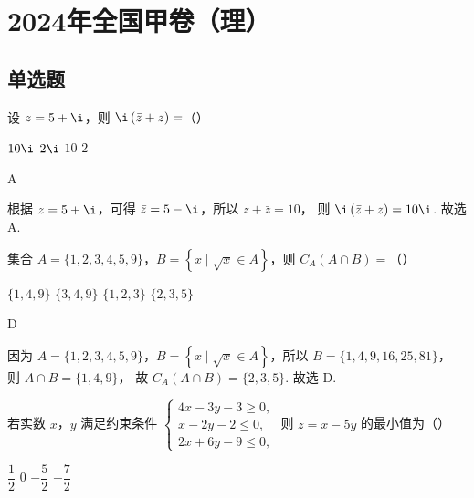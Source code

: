 \chapter{2024年全国甲卷（理）}

\section{单选题}

\begin{problem}
设 \( z=5+\i \)，则 \( \i \left( \bar z+z \right)= \)（\quad）

\choices
    {\( 10\i \)}
    {\( 2\i \)}
    {\( 10 \)}
    {\( 2 \)}
\end{problem}

\begin{answer}
A
\end{answer}

\begin{solution}
根据 \( z=5+\i \)，可得 \( \bar z=5-\i \)，所以
\(z+\bar z=10\)，
则
\(\i \left( \bar z+z \right)=10\i\).
故选 A.
\end{solution}

\begin{problem}
集合 \( A=\{1,2,3,4,5,9\} \)，\( B=\left\{ x \mid \sqrt{x}\in A \right\} \)，则 \( C_A\left( A\cap B \right)= \)（\quad）

\choices
    {\( \{1,4,9\} \)}
    {\( \{3,4,9\} \)}
    {\( \{1,2,3\} \)}
    {\( \{2,3,5\} \)}
\end{problem}

\begin{answer}
D
\end{answer}

\begin{solution}
因为 \( A=\{1,2,3,4,5,9\} \)，\( B=\left\{ x \mid \sqrt{x}\in A \right\} \)，所以
\(B=\{1,4,9,16,25,81\}\)，
则
\(A\cap B=\{1,4,9\}\)，
故
\(C_A\left( A\cap B \right)=\{2,3,5\}\).
故选 D.
\end{solution}

\begin{problem}
若实数 \(x\)，\(y\) 满足约束条件
\(\begin{cases}
4x-3y-3\ge 0,\\
x-2y-2\le 0,\\
2x+6y-9\le 0,
\end{cases}\)
则 \( z=x-5y \) 的最小值为（\quad）

\choices
    {\( \dfrac{1}{2} \)}
    {\( 0 \)}
    {\( -\dfrac{5}{2} \)}
    {\( -\dfrac{7}{2} \)}
\end{problem}

